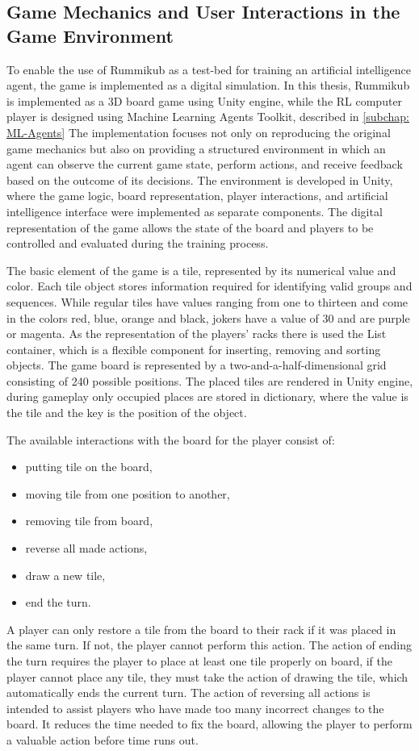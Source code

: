 \subsection{Game Mechanics and User Interactions in the Game Environment}
To enable the use of Rummikub as a test-bed for training an artificial intelligence agent, the game is implemented as a digital simulation.
In this thesis, Rummikub is implemented as a 3D board game using Unity engine, while the RL computer player is designed using Machine Learning Agents Toolkit, described in \ref{subchap: ML-Agents}
The implementation focuses not only on reproducing the original game mechanics but also on providing a structured environment in which an agent can observe the current game state, perform actions, and receive feedback based on the outcome of its decisions.
The environment is developed in Unity, where the game logic, board representation, player interactions, and artificial intelligence interface were implemented as separate components. The digital representation of the game allows the state of the board and players to be controlled and evaluated during the training process.

The basic element of the game is a tile, represented by its numerical value and color. Each tile object stores information required for identifying valid groups and sequences. While regular tiles have values ranging from one to thirteen and come in the colors red, blue, orange and black, jokers have a value of 30 and are purple or magenta.
As the representation of the players' racks there is used the List container, which is a flexible component for inserting, removing and sorting objects. 
The game board is represented by a two-and-a-half-dimensional grid consisting of 240 possible positions. The placed tiles are rendered in Unity engine, during gameplay only occupied places are stored in dictionary, where the value is the tile and the key is the position of the object.

The available interactions with the board for the player consist of:
\begin{itemize}
	\item putting tile on the board,
	\item moving tile from one position to another,
	\item removing tile from board,
	\item reverse all made actions, 
	\item draw a new tile,
	\item end the turn.
\end{itemize}
A player can only restore a tile from the board to their rack if it was placed in the same turn. If not, the player cannot perform this action. The action of ending the turn requires the player to place at least one tile properly on board, if the player cannot place any tile, they must take the action of drawing the tile, which automatically ends the current turn. The action of reversing all actions is intended to assist players who have made too many incorrect changes to the board. It reduces the time needed to fix the board, allowing the player to perform a valuable action before time runs out.

